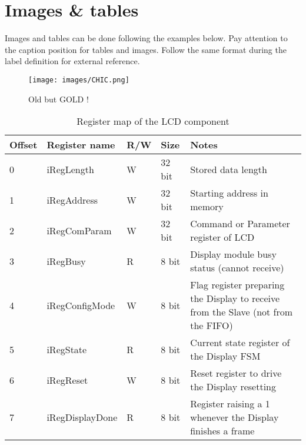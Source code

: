 \newpage
\section{Images \& tables}
\label{sec:images-tables}

Images and tables can be done following the examples below. Pay attention to the caption position for tables and images. Follow the same format during the label definition for external reference.

\begin{figure}[ht]
    \centering
    \texttt{[image: images/CHIC.png]}
    \caption{Old but GOLD !}
    \label{fig:CHIC}
\end{figure}

\begin{table}[h!]
    \centering
    \caption{Register map of the LCD component}
    \label{tab:register-map}
    \begin{tabular}{ | p{1cm} | p{3.5cm} | p{1cm} | p{1cm} | p{6cm} | }
        \hline
        Offset      & Register name     & R/W   & Size       & Notes \\
        \hline
        \hline
        0   & iRegLength        & W     & 32 bit     &  Stored data length \\
        1   & iRegAddress       & W     & 32 bit     &  Starting address in memory\\
        2   & iRegComParam      & W     & 32 bit     &  Command or Parameter register of LCD \\
        3   & iRegBusy          & R     & 8 bit      &  Display module busy status (cannot receive)\\
        4   & iRegConfigMode    & W     & 8 bit      &  Flag register preparing the Display to receive from the                                                       Slave (not from the FIFO)\\
        5   & iRegState         & R     & 8 bit      &  Current state register of the Display FSM\\
        6   & iRegReset         & W     & 8 bit      &  Reset register to drive the Display resetting\\
        7   & iRegDisplayDone   & R     & 8 bit      &  Register raising a 1 whenever the Display finishes a frame\\
        \hline
    \end{tabular}
\end{table}